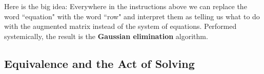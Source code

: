 Here is the big idea: 
Everywhere in the instructions above we can replace the word ``equation" with the word ``row" and interpret them as telling us what to do with the augmented matrix instead of the system of equations.
Performed systemically, the result is the {\bfseries Gaussian elimination} algorithm. 
%
%


\subsection{Equivalence and the Act of Solving}



